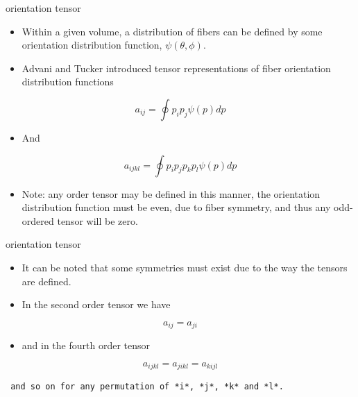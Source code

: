 \documentclass[
  letterpaper,
  ignorenonframetext,
  aspectratio=43,
  handout,
  12pt]{beamer}
\providecommand{\tightlist}{%
  \setlength{\itemsep}{0pt}\setlength{\parskip}{0pt}}
\providecommand{\tightlist}{%
\setlength{\itemsep}{0pt}\setlength{\parskip}{0pt}}
\begin{document}
\begin{frame}{orientation tensor}
\protect\hypertarget{orientation-tensor}{}
\begin{itemize}
\tightlist
\item
  Within a given volume, a distribution of fibers can be defined by some
  orientation distribution function, \(\psi(\theta, \phi)\).
\item
  Advani and Tucker introduced tensor representations of fiber
  orientation distribution functions
\end{itemize}

\[a_{ij} = \oint p_i p_j \psi(p) dp\]

\begin{itemize}
\tightlist
\item
  And
\end{itemize}

\[a_{ijkl} = \oint p_i p_j p_k p_l\psi(p) dp\]

\begin{itemize}
\tightlist
\item
  Note: any order tensor may be defined in this manner, the orientation
  distribution function must be even, due to fiber symmetry, and thus
  any odd-ordered tensor will be zero.
\end{itemize}
\end{frame}

\begin{frame}[fragile]{orientation tensor}
\protect\hypertarget{orientation-tensor-1}{}
\begin{itemize}
\tightlist
\item
  It can be noted that some symmetries must exist due to the way the
  tensors are defined.
\item
  In the second order tensor we have
\end{itemize}

\[a_{ij} = a_{ji}\]

\begin{itemize}
\tightlist
\item
  and in the fourth order tensor
\end{itemize}

\[a_{ijkl} = a_{jikl} = a_{kijl}\]

\begin{verbatim}
 and so on for any permutation of *i*, *j*, *k* and *l*.
\end{verbatim}
\end{frame}
\end{document}
